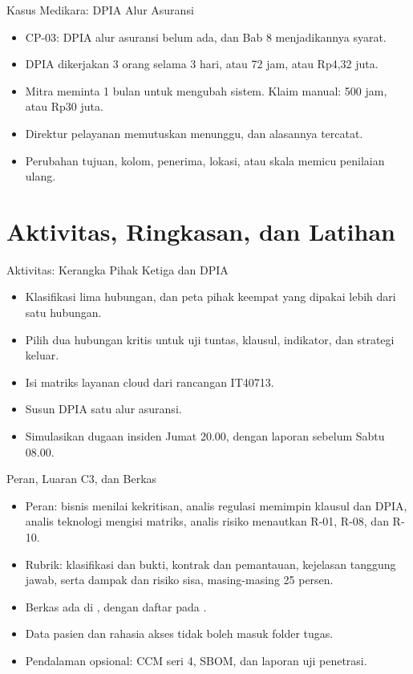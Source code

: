 \documentclass[aspectratio=169, table, 12pt]{beamer}
\begin{document}
\begin{frame}{{\Large Kasus Medikara: DPIA Alur Asuransi}}
  \vspace{6pt}
  \small
  \begin{itemize}
    \item CP-03: DPIA alur asuransi belum ada, dan Bab 8 menjadikannya syarat.
    \item DPIA dikerjakan 3 orang selama 3 hari, atau 72 jam, atau Rp4,32 juta.
    \item Mitra meminta 1 bulan untuk mengubah sistem. Klaim manual: 500 jam, atau Rp30 juta.
    \item Direktur pelayanan memutuskan menunggu, dan alasannya tercatat.
    \item Perubahan tujuan, kolom, penerima, lokasi, atau skala memicu penilaian ulang.
  \end{itemize}
\end{frame}

\section{Aktivitas, Ringkasan, dan Latihan}

\begin{frame}{{\Large Aktivitas: Kerangka Pihak Ketiga dan DPIA}}
  \vspace{6pt}
  \small
  \begin{itemize}
    \item Klasifikasi lima hubungan, dan peta pihak keempat yang dipakai lebih dari satu hubungan.
    \item Pilih dua hubungan kritis untuk uji tuntas, klausul, indikator, dan strategi keluar.
    \item Isi matriks layanan cloud dari rancangan IT40713.
    \item Susun DPIA satu alur asuransi.
    \item Simulasikan dugaan insiden Jumat 20.00, dengan laporan sebelum Sabtu 08.00.
  \end{itemize}
\end{frame}

\begin{frame}{{\Large Peran, Luaran C3, dan Berkas}}
  \vspace{6pt}
  \small
  \begin{itemize}
    \item Peran: bisnis menilai kekritisan, analis regulasi memimpin klausul dan DPIA, analis
          teknologi mengisi matriks, analis risiko menautkan R-01, R-08, dan R-10.
    \item Rubrik: klasifikasi dan bukti, kontrak dan pemantauan, kejelasan tanggung jawab, serta
          dampak dan risiko sisa, masing-masing 25 persen.
    \item Berkas ada di , dengan daftar pada .
    \item Data pasien dan rahasia akses tidak boleh masuk folder tugas.
    \item Pendalaman opsional: CCM seri 4, SBOM, dan laporan uji penetrasi.
  \end{itemize}
\end{frame}
\end{document}
